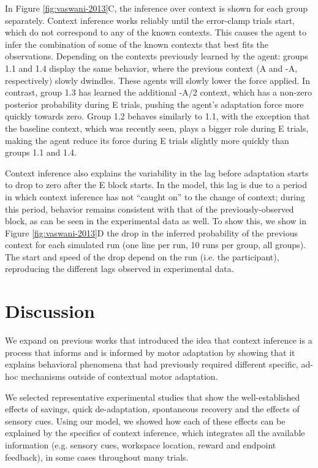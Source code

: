 \documentclass[a4paper,doc,floatsintext,natbib]{apa6}%
\def \fref #1{Figure \ref{#1}}     %
\begin{document}
In \fref{fig:vaswani-2013}C, the inference over context is shown for each group separately. Context inference works reliably until the error-clamp trials start, which do not correspond to any of the known contexts. This causes the agent to infer the combination of some of the known contexts that best fits the observations. Depending on the contexts previously learned by the agent: groups 1.1 and 1.4 display the same behavior, where the previous context (A and -A, respectively) slowly dwindles. These agents will slowly lower the force applied. In contrast, group 1.3 has learned the additional -A/2 context, which has a non-zero posterior probability during E trials, pushing the agent's adaptation force more quickly towards zero. Group 1.2 behaves similarly to 1.1, with the exception that the baseline context, which was recently seen, plays a bigger role during E trials, making the agent reduce its force during E trials slightly more quickly than groups 1.1 and 1.4. 

Context inference also explains the variability in the lag before adaptation starts to drop to zero after the E block starts. In the model, this lag is due to a period in which context inference has not ``caught on'' to the change of context; during this period, behavior remains consistent with that of the previously-observed block, as can be seen in the experimental data as well. To show this, we show in \fref{fig:vaswani-2013}D the drop in the inferred probability of the previous context for each simulated run (one line per run, 10 runs per group, all groups). The start and speed of the drop depend on the run (i.e. the participant), reproducing the different lags observed in experimental data.

\section{Discussion}
We expand on previous works \cite{Heald_Contextual_2021,Oh_Minimizing_2019} that introduced the idea that context inference is a process that informs and is informed by motor adaptation by showing that it explains behavioral phenomena that had previously required different specific, ad-hoc mechanisms outside of contextual motor adaptation. 

We selected representative experimental studies that show the well-established effects of savings, quick de-adaptation, spontaneous recovery and the effects of sensory cues. Using our model, we showed how each of these effects can be explained by the specifics of context inference, which integrates all the available information (e.g. sensory cues, workspace location, reward and endpoint feedback), in some cases throughout many trials.
\end{document}
